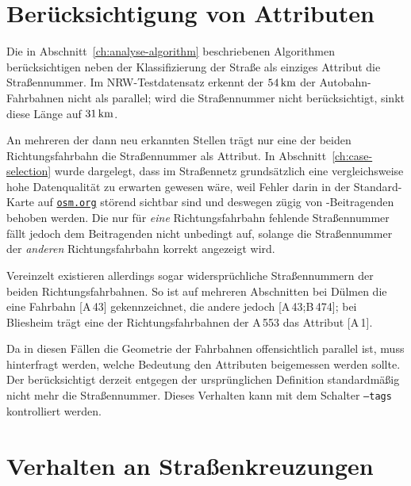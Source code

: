 \documentclass[../main/thesis.tex]{subfiles}
\begin{document}
\section{Berücksichtigung von Attributen}
\label{ch:result-tags}

Die in Abschnitt~\ref{ch:analyse-algorithm} beschriebenen Algorithmen berücksichtigen neben der Klassifizierung der Straße als einziges Attribut die Straßennummer.
Im NRW-Testdatensatz erkennt der  $\unit[54]{km}$ der Autobahn-Fahrbahnen nicht als parallel; wird die Straßennummer nicht berücksichtigt, sinkt diese Länge auf $\unit[31]{km}$.

An mehreren der dann neu erkannten Stellen trägt nur eine der beiden Richtungsfahrbahn die Straßennummer als Attribut.
In Abschnitt~\ref{ch:case-selection} wurde dargelegt, dass im Straßennetz grundsätzlich eine vergleichsweise hohe Datenqualität zu erwarten gewesen wäre, weil Fehler darin in der Standard-Karte auf \href{https://www.openstreetmap.org/}{\nolinkurl{osm.org}} störend sichtbar sind und deswegen zügig von \osm-Beitragenden behoben werden.
Die nur für \emph{eine} Richtungsfahrbahn fehlende Straßennummer fällt jedoch dem Beitragenden nicht unbedingt auf, solange die Straßennummer der \emph{anderen} Richtungsfahrbahn korrekt angezeigt wird.

Vereinzelt existieren allerdings sogar widersprüchliche Straßennummern der beiden Richtungsfahrbahnen.
So ist auf mehreren Abschnitten bei Dülmen die eine Fahrbahn [A\,43] gekennzeichnet, die andere jedoch [A\,43;B\,474]; bei Bliesheim trägt eine der Richtungsfahrbahnen der A\,553 das Attribut [A\,1].

Da in diesen Fällen die Geometrie der Fahrbahnen offensichtlich parallel ist, muss hinterfragt werden, welche Bedeutung den Attributen beigemessen werden sollte.
Der  berücksichtigt derzeit entgegen der ursprünglichen Definition standardmäßig nicht mehr die Straßennummer.
Dieses Verhalten kann mit dem Schalter \texttt{--tags} kontrolliert werden.



\section{Verhalten an Straßenkreuzungen}
\label{ch:result-junctions}
\end{document}
